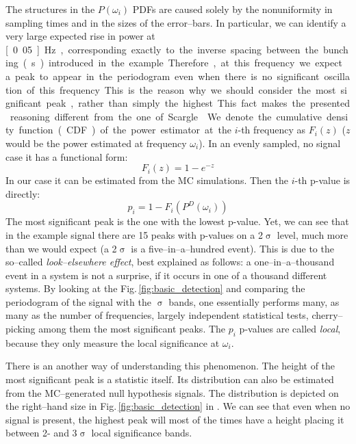 The structures in the $P(\omega_i)$ PDFs are caused solely by the nonuniformity in sampling times and in the sizes of the error--bars. In particular, we can identify a very large expected rise in power at \unit[0.05]{Hz}, corresponding exactly to the inverse spacing between the bunching (\unit[20]{s}) introduced in the example. Therefore, at this frequency we expect a peak to appear in the periodogram even when there is no significant oscillation of this frequency. This is the reason why we should consider the most significant peak, rather than simply the highest. This fact makes the presented reasoning different from the one of Scargle~\cite{Scargle1982}.

We denote the cumulative density function (CDF) of the power estimator at the $i$-th frequency as $F_i(z)$ ($z$ would be the power estimated at frequency $\omega_i$). In an evenly sampled, no signal case it has a functional form:
\begin{equation}
  F_i(z) = 1 - e^{-z}
\end{equation}
In our case it can be estimated from the MC simulations. Then the $i$-th p-value is directly:
\begin{equation} \label{eq:local_p_value}
  p_i = 1 - F_i\left( P^D(\omega_i) \right)
\end{equation}
The most significant peak is the one with the lowest p-value. Yet, we can see that in the example signal there are 15 peaks with p-values on a 2$\upsigma$ level, much more than we would expect (a 2$\upsigma$ is a five--in--a--hundred event). This is due to the so--called \emph{look--elsewhere effect}, best explained as follows: a one--in--a--thousand event in a system is not a surprise, if it occurs in one of a thousand different systems. By looking at the Fig.\,\ref{fig:basic_detection} and comparing the periodogram of the signal with the $\upsigma$ bands, one essentially performs many, as many as the number of frequencies, largely independent statistical tests, cherry--picking among them the most significant peaks. The $p_i$ p-values are called \emph{local}, because they only measure the local significance at $\omega_i$.

There is an another way of understanding this phenomenon. The height of the most significant peak is a statistic itself. Its distribution can also be estimated from the MC--generated null hypothesis signals. The distribution is depicted on the right--hand size in Fig.\,\ref{fig:basic_detection} in . We can see that even when no signal is present, the highest peak will most of the times have a height placing it between 2- and 3$\upsigma$ local significance bands.

